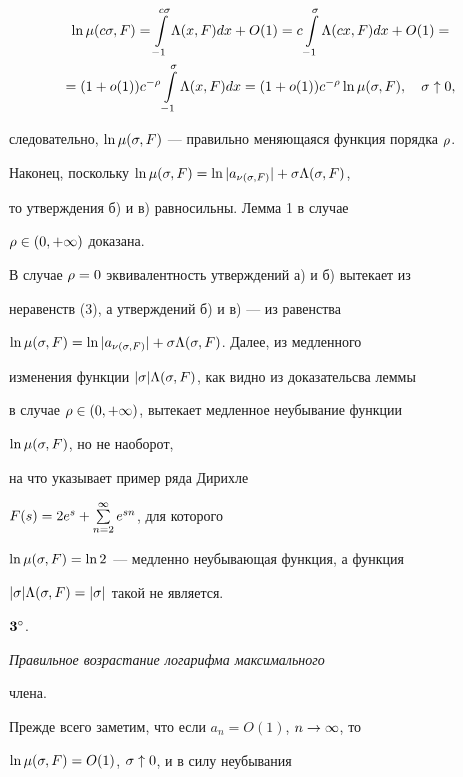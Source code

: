 \begin{pf}
\begin{multline*}


\ln \mu(c\s,F)=\int\limits_{-1}^{c\s}\L(x,F)dx+O(1)=


c\int\limits_{-1}^{\s}\L(cx,F)dx+O(1)=\\


=(1+o(1))c^{-\r}\int\limits_{-1}^{\s}\L(x,F)dx=


(1+o(1))c^{-\r}\ln \mu(\s,F),\quad \s\uparrow 0,


\end{multline*}


следовательно, $\ln \mu(\sigma,F)$ --- правильно меняющаяся функция порядка $\rho$.





Наконец, поскольку $\ln \mu(\sigma,F)=\ln |a_{\nu(\sigma,F)}|+\sigma\Lambda(\sigma,F)$,


то утверждения б) и в) равносильны. Лемма 1 в случае 


$\rho\in(0,+\infty)$ доказана.





В случае $\rho=0$ эквивалентность утверждений а) и б) вытекает из 


неравенств (3), а утверждений б) и в) --- из равенства


$\ln \mu(\sigma,F)= \ln |a_{\nu(\sigma,F)}|+\sigma\Lambda(\sigma,F)$. Далее, из медленного


изменения функции  $|\sigma|\Lambda(\sigma,F)$, как видно из доказательсва леммы


в случае $\rho\in(0,+\infty)$, вытекает медленное неубывание функции


$\ln \mu(\sigma,F)$, но не наоборот, 


на что указывает пример ряда Дирихле


$F(s)=2e^s+\sum\limits_{n=2}^{\infty}e^{sn}$, для которого


$\ln \mu(\sigma,F)=\ln 2$ --- медленно неубывающая функция, а функция


$|\sigma|\Lambda(\sigma,F)=|\sigma|$ такой не является.


\end{pf}








$\bold 3^\circ$. {\it Правильное возрастание логарифма максимального


члена.} Прежде всего заметим, что если $a_n=O(1)$, $n\to\infty$, то


$\ln\mu(\sigma,F)=O(1)$, $\sigma\uparrow 0$, и в силу неубывания 


